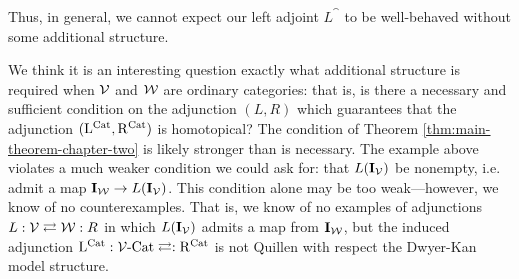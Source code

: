 \documentclass[12pt]{amsart}
\begin{document}
Thus, in general, we cannot expect our left adjoint $L^\cat$ to be well-behaved without some additional structure. 
\par 
We think it is an interesting question exactly what additional structure is required when $\mathcal{V}$ and $\mathcal{W}$ are ordinary categories: that is, is there a necessary and sufficient condition on the adjunction $(L,R)$ which guarantees that the adjunction $(\mathrm{L}^{\mathrm{Cat}}, \mathrm{R}^{\mathrm{Cat}})$ is homotopical? 
The condition of Theorem \ref{thm:main-theorem-chapter-two} is likely stronger than is necessary.
The example above violates a much weaker condition we could ask for: that $L(\mathbf{I}_\mathcal{V})$ be nonempty, i.e. admit a map $\mathbf{I}_\mathcal{W} \to L(\mathbf{I}_\mathcal{V})$. 
This condition alone may be too weak---however, we know of no counterexamples. 
That is, we know of no examples of adjunctions $L : \mathcal{V} \rightleftarrows \mathcal{W} : R$ in which $L(\mathbf{I}_\mathcal{V})$ admits a map from $\mathbf{I}_\mathcal{W}$, but the induced adjunction $\mathrm{L}^{\mathrm{Cat}} : \mathcal{V}\text{-}\mathrm{Cat} \rightleftarrows : \mathrm{R}^{\mathrm{Cat}}$ is not Quillen with respect the Dwyer-Kan model structure.


\printbibliography
\end{document}
